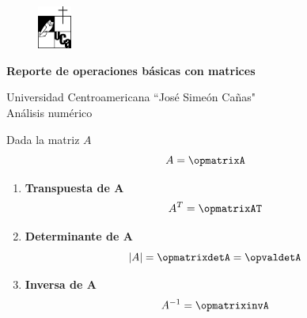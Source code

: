 \documentclass{article}
\newenvironment{fmpage}[1]
{\begin{lrbox}{\fmbox}\begin{minipage}{#1}}
{\end{minipage}\end{lrbox}\fbox{\usebox{\fmbox}}}
\begin{document}
\begin{center}
\begin{minipage}{\linewidth}
\vspace{-0.5cm}
\begin{fmpage}{\linewidth}
\vspace{0.5cm}
\begin{figure}
\vspace{-1.0cm}

\centering
\includegraphics[width=0.1\textwidth]{logo}
\end{figure}
\LARGE{\textbf {Reporte de operaciones b\'asicas con matrices}}

\vspace{0.5cm}
\large{Universidad Centroamericana ``Jos\'e Sime\'on Ca\~nas"} \\
\large{An\'alisis num\'erico}
\vspace{0.5cm}
\end{fmpage}
\vspace{1cm}
\end{minipage}
\end{center}


\large{Dada la matriz $A$}
\[
A
=
\opmatrixA
\]
\begin{enumerate}
\item \large{\textbf{Transpuesta de $\mathbf{A}$}}
\[
A^T
=
\opmatrixAT
\]

\item \large{\textbf{Determinante de $\mathbf{A}$}}
\[
|A|=
\opmatrixdetA
=
\opvaldetA
\]
\item \large{\textbf{Inversa de $\mathbf{A}$}}
\[
A^{-1}=
\opmatrixinvA
\]
\end{enumerate}
\end{document}
